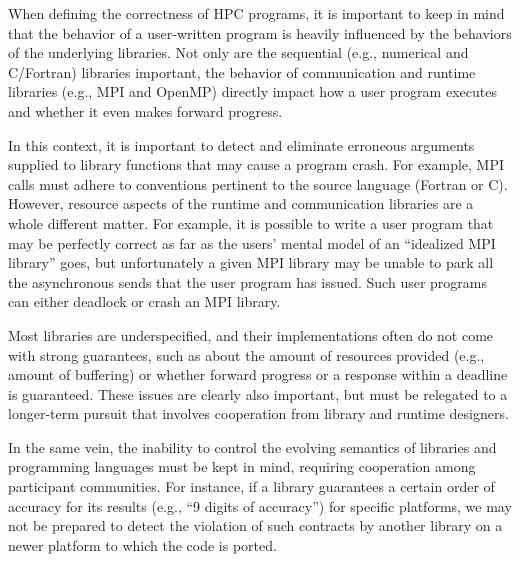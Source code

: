 When defining the correctness of HPC programs, it is important to keep in mind that the behavior of a user-written program is heavily influenced by the
behaviors of the underlying libraries.
%
Not only are the sequential (e.g., numerical and C/Fortran) libraries important, the behavior of communication and runtime libraries (e.g., MPI and OpenMP) directly impact how a user program executes and whether it even makes forward progress.

In this context, it is important to detect
and eliminate
erroneous arguments supplied to library functions
that may cause a program crash. 
For example, MPI calls must adhere to conventions pertinent to
the source language (Fortran or C).
%
However, resource aspects of the runtime and communication libraries are a whole different matter.
%
%
For example, it is possible to write a user program that may be perfectly correct as far as the users' mental model of an ``idealized MPI library'' goes, but unfortunately a given MPI library may be unable to park all the asynchronous sends that the user program has issued.
%
Such user programs can either deadlock or crash an MPI library.


Most libraries are
underspecified, and their implementations often do not come with strong
guarantees, such as about the amount of resources provided (e.g., amount of
buffering) or whether forward progress or a response within a
deadline is guaranteed. 
%
These issues are clearly also important, but must be relegated to a longer-term pursuit that involves cooperation from library and runtime designers.




In the same vein,
the inability to control the evolving semantics of libraries and
programming languages must be kept in mind, requiring cooperation
among participant communities.   For instance, if a library
guarantees a certain order of accuracy for its results (e.g., ``9
digits of accuracy'') for specific platforms, we may not be prepared
to detect the violation of such contracts by another library
on a newer platform to which the code is ported.






